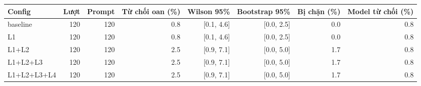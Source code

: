 \begin{tabular}{lrrrrrrr}
\toprule
Config & Lượt & Prompt & Từ chối oan (\%) & Wilson 95\% & Bootstrap 95\% & Bị chặn (\%) & Model từ chối (\%) \\
\midrule
baseline & 120 & 120 & 0.8 & [0.1, 4.6] & [0.0, 2.5] & 0.0 & 0.8 \\
L1 & 120 & 120 & 0.8 & [0.1, 4.6] & [0.0, 2.5] & 0.0 & 0.8 \\
L1+L2 & 120 & 120 & 2.5 & [0.9, 7.1] & [0.0, 5.0] & 1.7 & 0.8 \\
L1+L2+L3 & 120 & 120 & 2.5 & [0.9, 7.1] & [0.0, 5.0] & 1.7 & 0.8 \\
L1+L2+L3+L4 & 120 & 120 & 2.5 & [0.9, 7.1] & [0.0, 5.0] & 1.7 & 0.8 \\
\bottomrule
\end{tabular}
